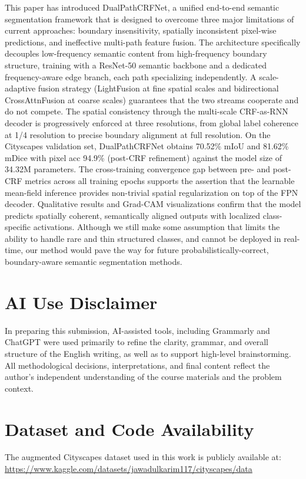 \documentclass[conference]{IEEEtran}
\begin{document}
This paper has introduced DualPathCRFNet, a unified end-to-end semantic segmentation framework that
is designed to overcome three major limitations of current approaches: boundary insensitivity, spatially
inconsistent pixel-wise predictions, and ineffective multi-path feature fusion. The architecture specifically
decouples low-frequency semantic content from high-frequency boundary structure, training with a
ResNet-50 semantic backbone and a dedicated frequency-aware edge branch, each path specializing
independently. A scale-adaptive fusion strategy (LightFusion at fine spatial scales and bidirectional
CrossAttnFusion at coarse scales) guarantees that the two streams cooperate and do not compete. The
spatial consistency through the multi-scale CRF-as-RNN decoder is progressively enforced at three
resolutions, from global label coherence at 1/4 resolution to precise boundary alignment at full resolution.
On the Cityscapes validation set, DualPathCRFNet obtains 70.52\% mIoU and 81.62\% mDice with pixel
acc 94.9\% (post-CRF refinement) against the model size of 34.32M parameters. The cross-training
convergence gap between pre- and post-CRF metrics across all training epochs supports the assertion that
the learnable mean-field inference provides non-trivial spatial regularization on top of the FPN decoder.
Qualitative results and Grad-CAM visualizations confirm that the model predicts spatially coherent,
semantically aligned outputs with localized class-specific activations. Although we still make some
assumption that limits the ability to handle rare and thin structured classes, and cannot be deployed in real-time, our method would pave the way for future probabilistically-correct, boundary-aware semantic
segmentation methods.

\section*{AI Use Disclaimer}
In preparing this submission, AI-assisted tools, including Grammarly and ChatGPT were used
primarily to refine the clarity, grammar, and overall structure of the English writing, as well
as to support high-level brainstorming. All methodological decisions, interpretations, and final
content reflect the author's independent understanding of the course materials and the problem
context.

\section*{Dataset and Code Availability}
The augmented Cityscapes dataset used in this work is publicly available at:
\url{https://www.kaggle.com/datasets/jawadulkarim117/cityscapes/data}
\end{document}
